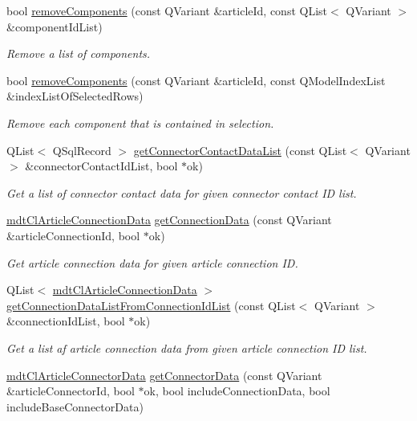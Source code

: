 \begin{DoxyCompactItemize}
bool \hyperlink{classmdt_cl_article_a95fb4303d579cc13e590de21f2ad7d52}{remove\-Components} (const Q\-Variant \&article\-Id, const Q\-List$<$ Q\-Variant $>$ \&component\-Id\-List)
\begin{DoxyCompactList}\small\item\em Remove a list of components. \end{DoxyCompactList}\item 
bool \hyperlink{classmdt_cl_article_a2b8c9c7dfa1061b729918432ae3ee006}{remove\-Components} (const Q\-Variant \&article\-Id, const Q\-Model\-Index\-List \&index\-List\-Of\-Selected\-Rows)
\begin{DoxyCompactList}\small\item\em Remove each component that is contained in selection. \end{DoxyCompactList}\item 
Q\-List$<$ Q\-Sql\-Record $>$ \hyperlink{classmdt_cl_article_ab2f39d61d3cb50c4bfe7805fd1611169}{get\-Connector\-Contact\-Data\-List} (const Q\-List$<$ Q\-Variant $>$ \&connector\-Contact\-Id\-List, bool $\ast$ok)
\begin{DoxyCompactList}\small\item\em Get a list of connector contact data for given connector contact I\-D list. \end{DoxyCompactList}\item 
\hyperlink{classmdt_cl_article_connection_data}{mdt\-Cl\-Article\-Connection\-Data} \hyperlink{classmdt_cl_article_a2c591965b47436ddf946c94bb7017dee}{get\-Connection\-Data} (const Q\-Variant \&article\-Connection\-Id, bool $\ast$ok)
\begin{DoxyCompactList}\small\item\em Get article connection data for given article connection I\-D. \end{DoxyCompactList}\item 
Q\-List$<$ \hyperlink{classmdt_cl_article_connection_data}{mdt\-Cl\-Article\-Connection\-Data} $>$ \hyperlink{classmdt_cl_article_a687fa2ef645c2345cf70e3435f8b34e8}{get\-Connection\-Data\-List\-From\-Connection\-Id\-List} (const Q\-List$<$ Q\-Variant $>$ \&connection\-Id\-List, bool $\ast$ok)
\begin{DoxyCompactList}\small\item\em Get a list af article connection data from given article connection I\-D list. \end{DoxyCompactList}\item 
\hyperlink{classmdt_cl_article_connector_data}{mdt\-Cl\-Article\-Connector\-Data} \hyperlink{classmdt_cl_article_af78bc47b506700568f852a3aa9ab2380}{get\-Connector\-Data} (const Q\-Variant \&article\-Connector\-Id, bool $\ast$ok, bool include\-Connection\-Data, bool include\-Base\-Connector\-Data)

\end{DoxyCompactItemize}
